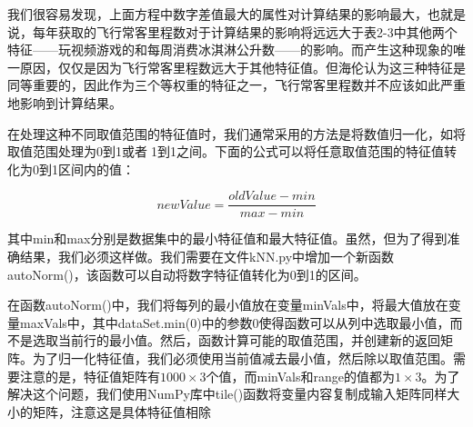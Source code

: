 我们很容易发现，上面方程中数字差值最大的属性对计算结果的影响最大，也就是说，每年获取的飞行常客里程数对于计算结果的影响将远远大于表2-3中其他两个特征——玩视频游戏的和每周消费冰淇淋公升数——的影响。而产生这种现象的唯一原因，仅仅是因为飞行常客里程数远大于其他特征值。但海伦认为这三种特征是同等重要的，因此作为三个等权重的特征之一，飞行常客里程数并不应该如此严重地影响到计算结果。

在处理这种不同取值范围的特征值时，我们通常采用的方法是将数值归一化，如将取值范围处理为0到1或者1到1之间。下面的公式可以将任意取值范围的特征值转化为0到1区间内的值：

$$newValue = \frac{oldValue-min}{max-min}$$

其中min和max分别是数据集中的最小特征值和最大特征值。虽然，但为了得到准确结果，我们必须这样做。我们需要在文件kNN.py中增加一个新函数autoNorm()，该函数可以自动将数字特征值转化为0到1的区间。

在函数autoNorm()中，我们将每列的最小值放在变量minVals中，将最大值放在变量maxVals中，其中dataSet.min(0)中的参数0使得函数可以从列中选取最小值，而不是选取当前行的最小值。然后，函数计算可能的取值范围，并创建新的返回矩阵。为了归一化特征值，我们必须使用当前值减去最小值，然后除以取值范围。需要注意的是，特征值矩阵有$1000\times3$个值，而minVals和range的值都为$1\times3$。为了解决这个问题，我们使用NumPy库中tile()函数将变量内容复制成输入矩阵同样大小的矩阵，注意这是具体特征值相除
